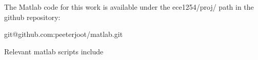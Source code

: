 \label{appendix:matlab}

The Matlab code for this work is available under the ece1254/proj/ path in the github repository:

\begin{center}
git@github.com:peeterjoot/matlab.git
\end{center}

Relevant matlab scripts include


